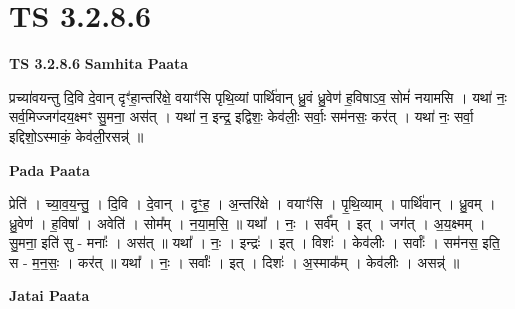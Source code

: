 \documentclass[17pt]{extarticle}
\begin{document}
\section{ TS 3.2.8.6 }

\textbf{TS 3.2.8.6 } \newline
\textbf{Samhita Paata} \newline

प्रच्या॑वयन्तु दि॒वि दे॒वान् दृꣳ॑हा॒न्तरि॑क्षे॒ वयाꣳ॑सि पृथि॒व्यां पार्थि॑वान् ध्रु॒वं ध्रु॒वेण॑ ह॒विषाऽव॒ सोमं॑ नयामसि । यथा॑ नः॒ सर्व॒मिज्जग॑दय॒क्ष्मꣳ सु॒मना॒ अस॑त् । यथा॑ न॒ इन्द्र॒ इद्विशः॒ केव॑लीः॒ सर्वाः॒ सम॑नसः॒ कर॑त् । यथा॑ नः॒ सर्वा॒ इद्दिशो॒ऽस्माकं॒ केव॑ली॒रसन्न्॑ ॥ \newline

\textbf{Pada Paata} \newline

प्रेति॑ । च्या॒व॒य॒न्तु॒ । दि॒वि । दे॒वान् । दृꣳ॒॒ह॒ । अ॒न्तरि॑क्षे । वयाꣳ॑सि । पृ॒थि॒व्याम् । पार्थि॑वान् । ध्रु॒वम् । ध्रु॒वेण॑ । ह॒विषा᳚ । अवेति॑ । सोम᳚म् । न॒या॒म॒सि॒ ॥ यथा᳚ । नः॒ । सर्व᳚म् । इत् । जग॑त् । अ॒य॒क्ष्मम् । सु॒मना॒ इति॑ सु - मनाः᳚ । अस॑त् ॥ यथा᳚ । नः॒ । इन्द्रः॑ । इत् । विशः॑ । केव॑लीः । सर्वाः᳚ । सम॑नस॒ इति॒ स - म॒न॒सः॒ । कर॑त् ॥ यथा᳚ । नः॒ । सर्वाः᳚ । इत् । दिशः॑ । अ॒स्माक᳚म् । केव॑लीः । असन्न्॑ ॥  \newline



\textbf{Jatai Paata} \newline
\end{document}
